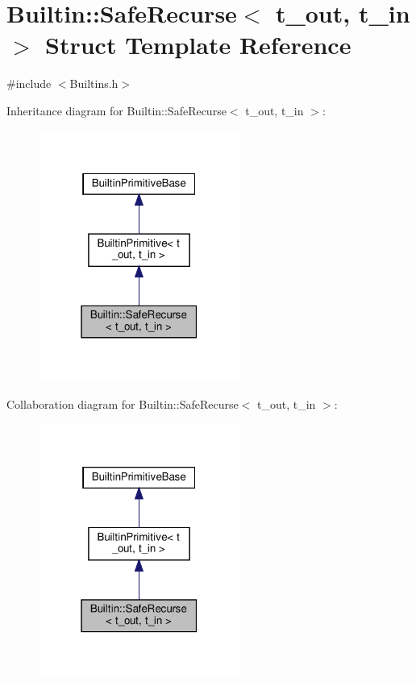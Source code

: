 \hypertarget{struct_builtin_1_1_safe_recurse}{}\section{Builtin\+:\+:Safe\+Recurse$<$ t\+\_\+out, t\+\_\+in $>$ Struct Template Reference}
\label{struct_builtin_1_1_safe_recurse}


{\ttfamily \#include $<$Builtins.\+h$>$}



Inheritance diagram for Builtin\+:\+:Safe\+Recurse$<$ t\+\_\+out, t\+\_\+in $>$\+:
\nopagebreak
\begin{figure}[H]
\begin{center}
\leavevmode
\includegraphics[width=187pt]{struct_builtin_1_1_safe_recurse__inherit__graph}
\end{center}
\end{figure}


Collaboration diagram for Builtin\+:\+:Safe\+Recurse$<$ t\+\_\+out, t\+\_\+in $>$\+:
\nopagebreak
\begin{figure}[H]
\begin{center}
\leavevmode
\includegraphics[width=187pt]{struct_builtin_1_1_safe_recurse__coll__graph}
\end{center}
\end{figure}

